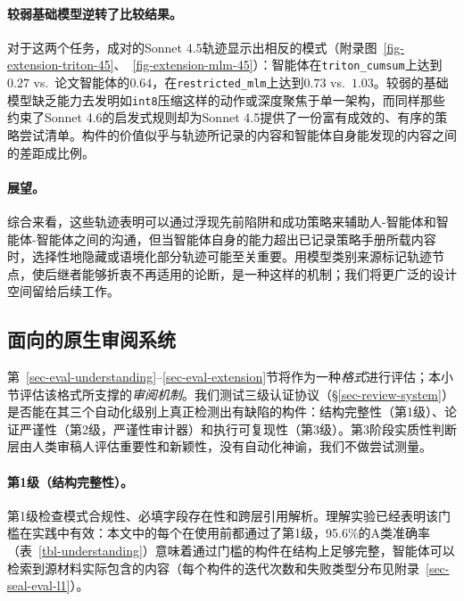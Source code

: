 \paragraph{较弱基础模型逆转了比较结果。}
对于这两个任务，成对的Sonnet 4.5轨迹显示出相反的模式（附录图~\ref{fig-extension-triton-45}、~\ref{fig-extension-mlm-45}）：\ara{}智能体在\texttt{triton\_cumsum}上达到$0.27$ vs.\ 论文智能体的$0.64$，在\texttt{restricted\_mlm}上达到$0.73$ vs.\ $1.03$。较弱的基础模型缺乏能力去发明如\texttt{int8}压缩这样的动作或深度聚焦于单一架构，而同样那些约束了Sonnet 4.6的启发式规则却为Sonnet 4.5提供了一份富有成效的、有序的策略尝试清单。构件的价值似乎与轨迹所记录的内容和智能体自身能发现的内容之间的差距成比例。

\paragraph{展望。}
综合来看，这些轨迹表明\ara{}可以通过浮现先前陷阱和成功策略来辅助人-智能体和智能体-智能体之间的沟通，但当智能体自身的能力超出已记录策略手册所载内容时，选择性地隐藏或语境化部分轨迹可能至关重要。用模型类别来源标记轨迹节点，使后继者能够折衷不再适用的论断，是一种这样的机制；我们将更广泛的设计空间留给后续工作。


\subsection{面向\ara{}的原生审阅系统}
\label{sec-eval-seal}

第~\ref{sec-eval-understanding}--\ref{sec-eval-extension}节将\ara{}作为一种\emph{格式}进行评估；本小节评估该格式所支撑的\emph{审阅机制}。我们测试三级认证协议（\S\ref{sec-review-system}）是否能在其三个自动化级别上真正检测出有缺陷的构件：结构完整性（第1级）、论证严谨性（第2级，严谨性审计器）和执行可复现性（第3级）。第3阶段实质性判断层由人类审稿人评估重要性和新颖性，没有自动化神谕，我们不做尝试测量。

\paragraph{第1级（结构完整性）。}
第1级检查模式合规性、必填字段存在性和跨层引用解析。理解实验已经表明该门槛在实践中有效：本文中的每个\ara{}在使用前都通过了第1级，95.6\%的A类准确率（表~\ref{tbl-understanding}）意味着通过门槛的构件在结构上足够完整，智能体可以检索到源材料实际包含的内容（每个构件的迭代次数和失败类型分布见附录~\ref{sec-seal-eval-l1}）。

